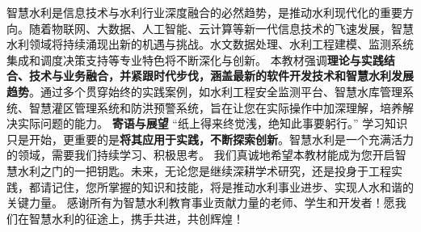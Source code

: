 智慧水利是信息技术与水利行业深度融合的必然趋势，是推动水利现代化的重要方向。随着物联网、大数据、人工智能、云计算等新一代信息技术的飞速发展，智慧水利领域将持续涌现出新的机遇与挑战。水文数据处理、水利工程建模、监测系统集成和调度决策支持等专业特色将不断深化与创新。 本教材强调\textbf{理论与实践结合、技术与业务融合，并紧跟时代步伐，涵盖最新的软件开发技术和智慧水利发展趋势}。通过多个贯穿始终的实践案例，如水利工程安全监测平台、智慧水库管理系统、智慧灌区管理系统和防洪预警系统，旨在让您在实际操作中加深理解，培养解决实际问题的能力。 \textbf{寄语与展望} ``纸上得来终觉浅，绝知此事要躬行。'' 学习知识只是开始，更重要的是\textbf{将其应用于实践，不断探索创新}。智慧水利是一个充满活力的领域，需要我们持续学习、积极思考。 我们真诚地希望本教材能成为您开启智慧水利之门的一把钥匙。未来，无论您是继续深耕学术研究，还是投身于工程实践，都请记住，您所掌握的知识和技能，将是推动水利事业进步、实现人水和谐的关键力量。 感谢所有为智慧水利教育事业贡献力量的老师、学生和开发者！愿我们在智慧水利的征途上，携手共进，共创辉煌！
